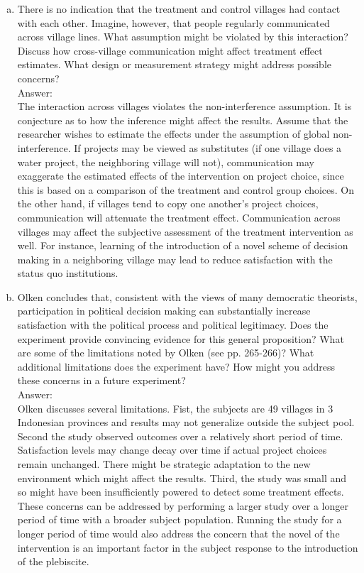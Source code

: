 \documentclass[11pt,notitlepage]{article}\usepackage[]{graphicx}\usepackage[]{color}
\begin{document}
\begin{enumerate}[a)]
\item There is no indication that the treatment and control villages had contact with each other. Imagine, however, that people regularly communicated across village lines. What assumption might be violated by this interaction? Discuss how cross-village communication might affect treatment effect estimates. What design or measurement strategy might address possible concerns?\\
Answer:\\
The interaction across villages violates the non-interference assumption. It is conjecture as to how the inference might affect the results. Assume that the researcher wishes to estimate the effects under the assumption of global non-interference. If projects may be viewed as substitutes (if one village does a water project, the neighboring village will not), communication may exaggerate the estimated effects of the intervention on project choice, since this is based on a comparison of the treatment and control group choices. On the other hand, if villages tend to copy one another's project choices, communication will attenuate the treatment effect. Communication across villages may affect the subjective assessment of the treatment intervention as well. For instance, learning of the introduction of a novel scheme of decision making in a neighboring village may lead to reduce satisfaction with the status quo institutions. 

\item Olken concludes that, consistent with the views of many democratic theorists, participation in political decision making can substantially increase satisfaction with the political process and political legitimacy. Does the experiment provide convincing evidence for this general proposition? What are some of the limitations noted by Olken (see pp. 265-266)? What additional limitations does the experiment have? How might you address these concerns in a future experiment?\\
Answer:\\
Olken discusses several limitations. Fist, the subjects are 49 villages in 3 Indonesian provinces and results may not generalize outside the subject pool. Second the study observed outcomes over a relatively short period of time. Satisfaction levels may change decay over time if actual project choices remain unchanged. There might be strategic adaptation to the new environment which might affect the results. Third, the study was small and so might have been insufficiently powered to detect some treatment effects. 
These concerns can be addressed by performing a larger study over a longer period of time with a broader subject population. Running the study for a longer period of time would also address the concern that the novel of the intervention is an important factor in the subject response to the introduction of the plebiscite.  


\end{enumerate}
\end{document}
